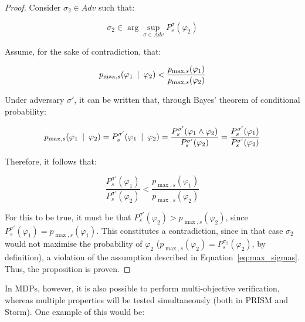 \begin{proof}



Consider $\sigma_2 \in Adv$ such that:

\begin{equation}
\label{eq:max_sigmas}
	\sigma_2 \in \arg\sup_{\sigma \in Adv} P^{\sigma}_s (\varphi_2)
\end{equation}

Assume, for the sake of contradiction, that:

\begin{equation}
	p_{\max, s} (\varphi_1 \:\mid\: \varphi_2) < \frac{p_{\max, s} (\varphi_1)}{p_{\max, s} (\varphi_2)}
\end{equation}

Under adversary $\sigma'$, it can be written that, through Bayes' theorem of conditional probability:

\begin{equation}
	p_{\max, s} (\varphi_1 \:\mid\: \varphi_2) = P^{\sigma'} _s(\varphi_1 \:\mid\: \varphi_2) = \frac{P^{\sigma'}_s (\varphi_1 \wedge \varphi_2)}{P^{\sigma'}_s (\varphi_2)} = \frac{P^{\sigma'}_s (\varphi_1)}{P^{\sigma'}_s (\varphi_2)}
\end{equation}

Therefore, it follows that:

\begin{equation}
	\frac{P^{\sigma'}_s (\varphi_1)}{P^{\sigma'}_s (\varphi_2)} < \frac{p_{\max, s} (\varphi_1)}{p_{\max, s} (\varphi_2)}
\end{equation}

For this to be true, it must be that $P^{\sigma'}_s (\varphi_2) > p_{\max, s} (\varphi_2)$, since $P^{\sigma'}_s (\varphi_1) = p_{\max, s} (\varphi_1)$. This constitutes a contradiction, since in that case $\sigma_2$ would not maximise the probability of $\varphi_2$ ($p_{\max, s} (\varphi_2) = P^{\sigma_2}_s (\varphi_2)$, by definition), a violation of the assumption described in Equation~\ref{eq:max_sigmas}. Thus, the proposition is proven.
\end{proof}

In MDPs, however, it is also possible to perform multi-objective verification, whereas multiple properties will be tested simultaneously (both in PRISM and Storm). One example of this would be:

